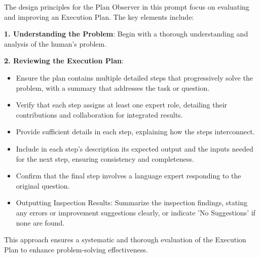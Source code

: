 The design principles for the Plan Observer in this prompt focus on evaluating and improving an Execution Plan. The key elements include:

\textbf{1. Understanding the Problem}: Begin with a thorough understanding and analysis of the human's problem.

\textbf{2. Reviewing the Execution Plan}:
\begin{itemize}
    \item Ensure the plan contains multiple detailed steps that progressively solve the problem, with a summary that addresses the task or question.
    \item Verify that each step assigns at least one expert role, detailing their contributions and collaboration for integrated results.
    \item Provide sufficient details in each step, explaining how the steps interconnect.
    \item Include in each step's description its expected output and the inputs needed for the next step, ensuring consistency and completeness.
    \item Confirm that the final step involves a language expert responding to the original question.
    \item Outputting Inspection Results: Summarize the inspection findings, stating any errors or improvement suggestions clearly, or indicate 'No Suggestions' if none are found.
\end{itemize}

This approach ensures a systematic and thorough evaluation of the Execution Plan to enhance problem-solving effectiveness.

